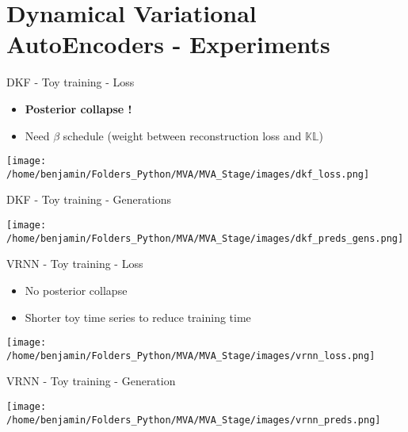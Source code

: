 \section{Dynamical Variational AutoEncoders - Experiments}\label{DVAEs and SDEs}

%
%

\begin{frame}{DKF - Toy training - Loss}
    \begin{itemize}
        \item \textbf{Posterior collapse !}
        \item Need $\beta$ schedule (weight between reconstruction loss and $\mathbb{KL}$)
    \end{itemize}
    \begin{center}
        \texttt{[image: /home/benjamin/Folders\_Python/MVA/MVA\_Stage/images/dkf\_loss.png]}
    \end{center}
\end{frame}

\begin{frame}{DKF - Toy training - Generations}
    \begin{center}
    \texttt{[image: /home/benjamin/Folders\_Python/MVA/MVA\_Stage/images/dkf\_preds\_gens.png]}
    \end{center}
\end{frame}

%
%


\begin{frame}{VRNN - Toy training - Loss}
    \begin{itemize}
        \item No posterior collapse
        \item Shorter toy time series to reduce training time
    \end{itemize}
    \begin{center}
        \texttt{[image: /home/benjamin/Folders\_Python/MVA/MVA\_Stage/images/vrnn\_loss.png]}
    \end{center}
\end{frame}

\begin{frame}{VRNN - Toy training - Generation}
    \begin{center}
    \texttt{[image: /home/benjamin/Folders\_Python/MVA/MVA\_Stage/images/vrnn\_preds.png]}
    \end{center}
\end{frame}


